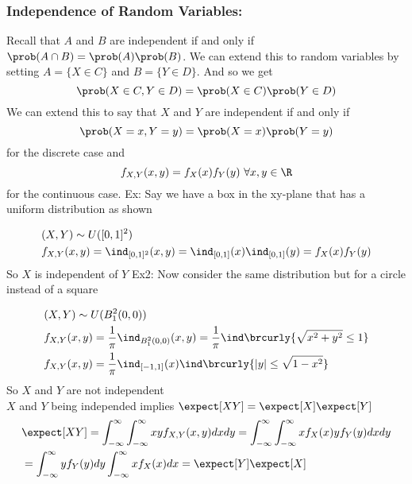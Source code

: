 \subsubsection{Independence of Random Variables:}
Recall that $A$ and $B$ are independent if and only if $\prob(A\cap B)=\prob(A)\prob(B)$. We can extend this to random variables by setting $A=\{X\in C\}$ and $B=\{Y\in D\}$. And so we get
\[\prob(X\in C,Y\in D)=\prob(X\in C)\prob(Y\in D)\]
We can extend this to say that $X$ and $Y$ are independent if and only if
\[\prob(X=x,Y=y)=\prob(X=x)\prob(Y=y)\]
for the discrete case and
\[f_{X,Y}(x,y)=f_X(x)f_Y(y)\ \forall x,y\in\R\]
for the continuous case.
Ex: Say we have a box in the xy-plane that has a uniform distribution as shown
\begin{center}
\end{center}
\begin{align*}
    &(X,Y)\sim U([0,1]^2)\\
    &f_{X,Y}(x,y)=\ind_{[0,1]^2}(x,y)=\ind_{[0,1]}(x)\ind_{[0,1]}(y)=f_X(x)f_Y(y)
\end{align*}
So $X$ is independent of $Y$
Ex2: Now consider the same distribution but for a circle instead of a square
\begin{center}
\end{center}
\begin{align*}
    &(X,Y)\sim U(B_1^2(0,0))\\
    &f_{X,Y}(x,y)=\frac{1}{\pi}\ind_{B_1^2(0,0)}(x,y)=\frac{1}{\pi}\ind\brcurly{\sqrt{x^2+y^2}\leq1}\\
    &f_{X,Y}(x,y)=\frac{1}{\pi}\ind_{[-1,1]}(x)\ind\brcurly{|y|\leq\sqrt{1-x^2}}
\end{align*}
So $X$ and $Y$ are not independent\\
$X$ and $Y$ being independed implies $\expect[XY]=\expect[X]\expect[Y]$
\begin{align*}
    &\expect[XY]=\int_{-\infty}^\infty\int_{-\infty}^\infty xyf_{X,Y}(x,y)dxdy=\int_{-\infty}^\infty\int_{-\infty}^\infty xf_X(x)yf_Y(y)dxdy\\
    &=\int_{-\infty}^\infty yf_Y(y)dy\int_{-\infty}^\infty xf_X(x)dx=\expect[Y]\expect[X]
\end{align*}

